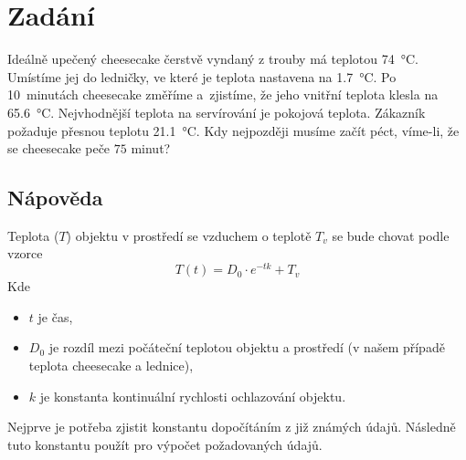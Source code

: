 \documentclass[12pt,a4paper,addpoints]{article}
\begin{document}
    \section{Zadání}
    Ideálně upečený cheesecake čerstvě vyndaný z trouby má teplotou \SI{74}{\celsius}. Umístíme jej do ledničky, ve které je teplota 
    nastavena na \SI{1,7}{\celsius}. Po 10~minutách cheesecake změříme a~zjistíme, že jeho vnitřní teplota klesla na \SI{65,6}{\celsius}.
    Nejvhodnější teplota na servírování je pokojová teplota. Zákazník požaduje přesnou teplotu  \SI{21,1}{\celsius}. Kdy nejpozději 
    musíme začít péct, víme-li, že se cheesecake peče $75$ minut?
   
    \subsection{Nápověda}
    Teplota ($T$) objektu v prostředí se vzduchem o teplotě $T_v$ se bude chovat podle vzorce
    $$T(t) = D_0 \cdot \textit{e}^{-tk} + T_v$$
    Kde 
    \begin{itemize}
        \item $t$ je čas,
        \item $D_0$ je rozdíl mezi počáteční teplotou objektu a prostředí (v našem případě teplota cheesecake a lednice),
        \item $k$ je konstanta kontinuální rychlosti ochlazování objektu.
    \end{itemize}

    Nejprve je potřeba zjistit konstantu dopočítáním z již známých údajů. Následně tuto konstantu použít pro výpočet požadovaných údajů. 

    \newpage
\end{document}
